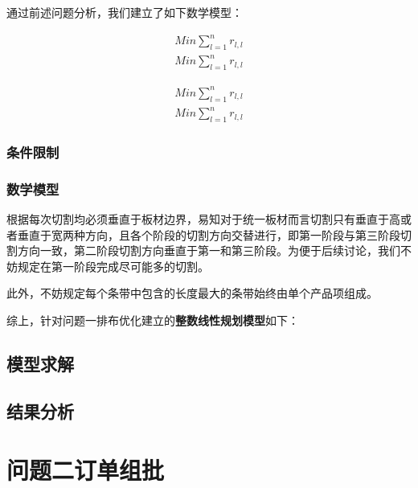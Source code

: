 \documentclass[bwprint]{gmcmthesis}
\begin{document}
通过前述问题分析，我们建立了如下数学模型：

\begin{equation}
    \begin{aligned}
    Min \sum_{l=1}^{n} r_{l,l}\\
    Min \sum_{l=1}^{n} r_{l,l}
    \end{aligned}
\end{equation}  


\begin{equation}
    \begin{aligned}
    Min \sum_{l=1}^{n} r_{l,l}\\
    Min \sum_{l=1}^{n} r_{l,l}
    \end{aligned}
\end{equation}  

\subsubsection{条件限制}

\subsubsection{数学模型}

根据每次切割均必须垂直于板材边界，易知对于统一板材而言切割只有垂直于高或者垂直于宽两种方向，且各个阶段的切割方向交替进行，即第一阶段与第三阶段切割方向一致，第二阶段切割方向垂直于第一和第三阶段。为便于后续讨论，我们不妨规定在第一阶段完成尽可能多的切割。







此外，不妨规定每个条带中包含的长度最大的条带始终由单个产品项组成。



综上，针对问题一排布优化建立的\textbf{整数线性规划模型}如下：

\subsection{模型求解}

\subsection{结果分析}

\section{问题二订单组批}
\end{document}

